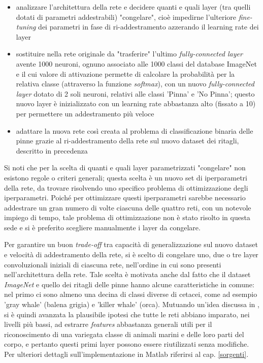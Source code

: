\begin{itemize}
\item analizzare l'architettura della rete e decidere quanti e quali layer (tra quelli dotati di parametri addestrabili) "congelare", cioè impedirne l'ulteriore \textit{fine-tuning} dei  parametri in fase di ri-addestramento azzerando il learning rate dei layer
\item sostituire nella rete originale da "trasferire" l'ultimo \textit{fully-connected layer} avente 1000 neuroni, ognuno associato alle 1000 classi del database ImageNet e il cui valore di attivazione permette di calcolare la probabilità per la relativa classe (attraverso la funzione \textit{softmax}), con un nuovo \textit{fully-connected layer} dotato di 2 soli neuroni, relativi alle classi 'Pinna' e 'No Pinna'; questo nuovo layer è inizializzato con un learning rate abbastanza alto (fissato a 10) per permettere un addestramento più veloce
\item adattare la nuova rete così creata al problema di classificazione binaria delle pinne grazie al ri-addestramento della rete sul nuovo dataset dei ritagli, descritto in precedenza
\end{itemize}

Si noti che per la scelta di quanti e quali layer parametrizzati "congelare" non esistono regole o criteri generali; questa scelta è un nuovo set di iperparametri della rete, da trovare risolvendo uno specifico problema di ottimizzazione degli iperparametri. Poiché per ottimizzare questi iperparametri sarebbe necessario addestrare un gran numero di volte ciascuna delle quattro reti, con un notevole impiego di tempo, tale problema di ottimizzazione non è stato risolto in questa sede e si è preferito scegliere manualmente i layer da congelare.

Per garantire un buon \textit{trade-off} tra capacità di generalizzazione sul nuovo dataset e velocità di addestramento della rete, si è scelto di congelare uno, due o tre layer convoluzionali iniziali di ciascuna rete, nell'ordine in cui sono presenti nell'architettura della rete.
Tale scelta è motivata anche dal fatto che il dataset \textit{ImageNet} e quello dei ritagli delle pinne hanno alcune caratteristiche in comune: nel primo ci sono almeno una decina di classi diverse di cetacei, come ad esempio 'gray whale' (balena grigia) e 'killer whale' (orca).
Mutuando un'idea discussa in \cite{howtransferable}, si è quindi avanzata la plausibile ipotesi che tutte le reti abbiano imparato, nei livelli più bassi, ad estrarre \textit{features} abbastanza generali utili per il riconoscimento di una variegata classe di animali marini e delle loro parti del corpo, e pertanto questi primi layer possono essere riutilizzati senza modifiche.
Per ulteriori dettagli sull'implementazione in Matlab riferirsi al cap. \ref{sorgenti}.\\

